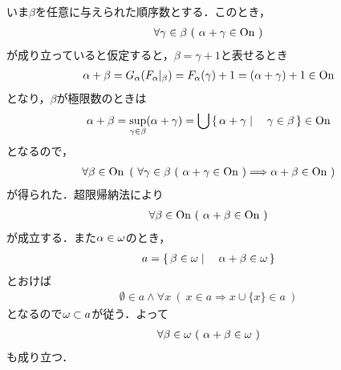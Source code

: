 	\begin{prf}
		いま$\beta$を任意に与えられた順序数とする．このとき，
		\begin{align}
			\forall \gamma \in \beta\ (\ \alpha + \gamma \in \mathrm{On}\ )
		\end{align}
		が成り立っていると仮定すると，$\beta = \gamma + 1$と表せるとき
		\begin{align}
			\alpha + \beta 
			= G_\alpha (F_\alpha|_\beta)
			= F_\alpha(\gamma) + 1
			= (\alpha + \gamma) + 1 \in \mathrm{On}
		\end{align}
		となり，$\beta$が極限数のときは
		\begin{align}
			\alpha + \beta = \operatorname*{sup}_{\gamma \in \beta} (\alpha + \gamma)
			= \bigcup \left\{\, \alpha + \gamma \mid \quad \gamma \in \beta\, \right\}
			\in \mathrm{On}
		\end{align}
		となるので，
		\begin{align}
			\forall \beta \in \ON\ \left(\ \forall \gamma \in \beta\ (\ \alpha + \gamma \in \ON\ ) \Longrightarrow \alpha + \beta \in \ON\ \right)
		\end{align}
		が得られた．超限帰納法により
		\begin{align}
			\forall \beta \in \mathrm{On}\ (\ \alpha + \beta \in \mathrm{On}\ )
		\end{align}
		が成立する．また$\alpha \in {\bf \omega}$のとき，
		\begin{align}
			a = \left\{\, \beta \in {\bf \omega} \mid \quad \alpha + \beta \in {\bf \omega}\, \right\}
		\end{align}
		とおけば
		\begin{align}
			\emptyset \in a \wedge \forall x\ (\ x \in a \Longrightarrow x \cup \{x\} \in a\ )
		\end{align}
		となるので${\bf \omega} \subset a$が従う．よって
		\begin{align}
			\forall \beta \in {\bf \omega}\ 
			(\ \alpha + \beta \in {\bf \omega}\ )
		\end{align}
		も成り立つ．
		\QED
	\end{prf}
	
